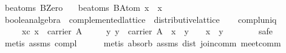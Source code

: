 \begin{isabellebody}
{}\ {}be{}atoms\ BZero\ {}\ {}{}{}\isanewline
{}\ {}be{}atoms\ {}BAtom\ x{}\ {}\ {}x{}{}\isanewline
\isanewline
{}\isamarkupfalse%
\ boolean{}algebra\ {}\ complemented{}lattice\ {}\ distributive{}lattice\isanewline
\isanewline
{}\isanewline
\isanewline
\ \ \isamarkupfalse%
\ compl{}uniq{}\isanewline
\ \ \ \ \ xc{}\ {}x\ {}\ carrier\ A{}\isanewline
\ \ \ \ \ {}{}{}y{}\ y\ {}\ carrier\ A\ {}\ x\ {}\ y\ {}\ {}\ {}\ x\ {}\ y\ {}\ {}{}\isanewline
%
\isadelimproof
\ \ \ \ %
\endisadelimproof
%
\isatagproof
{}\isamarkupfalse%
\ safe\isanewline
\ \ \ \ \isamarkupfalse%
\ {}metis\ assms\ compl{}\isanewline
\ \ \ \ \isamarkupfalse%
\ {}metis\ absorb{}\ assms\ dist{}\ join{}comm\ meet{}comm{}%
\endisatagproof
{\isafoldproof}%
%
\isadelimproof
\isanewline
%
\endisadelimproof

\end{isabellebody}
